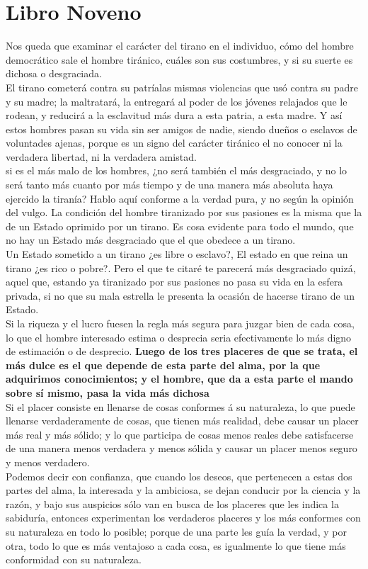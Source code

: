 \documentclass[10pt]{book}
\begin{document}
\chapter*{Libro Noveno}
Nos queda que examinar el carácter del tirano en el individuo, cómo del hombre democrático sale el hombre tiránico, cuáles son sus costumbres, y si su suerte es dichosa o desgraciada.\\ 
El tirano cometerá contra su patríalas mismas violencias que usó contra su padre y su madre; la maltratará, la entregará al poder de los jóvenes relajados que le rodean, y reducirá a la esclavitud más dura a esta patria, a esta madre. Y así estos hombres pasan su vida sin ser amigos de nadie, siendo dueños o esclavos de voluntades ajenas, porque es un signo del carácter tiránico el no conocer ni la verdadera libertad, ni la verdadera amistad.\\ 
 si es el más malo de los hombres, ¿no será también el más desgraciado, y no lo será tanto más cuanto por más tiempo y de una manera más absoluta haya ejercido la tiranía? Hablo aquí conforme a la verdad pura, y no según la opinión del vulgo. La condición del hombre tiranizado por sus pasiones es la misma que la de un Estado oprimido por un tirano. Es cosa evidente para todo el mundo, que no hay un Estado más desgraciado que el que obedece a un tirano. \\
Un Estado sometido a un tirano ¿es libre o esclavo?, El estado en que reina un tirano ¿es rico o pobre?. Pero el que te citaré te parecerá más desgraciado quizá, aquel que, estando ya tiranizado por sus pasiones no pasa su vida en la esfera privada, si no que su mala estrella le presenta la ocasión de hacerse tirano de un Estado.\\
Si la riqueza y el lucro fuesen la regla más segura para juzgar bien de cada cosa, lo que el hombre interesado estima o desprecia seria efectivamente lo más digno de estimación o de desprecio. 
\textbf{Luego de los tres placeres de que se trata, el más dulce es el que depende de esta parte del alma, por la que adquirimos conocimientos; y el hombre, que da a esta parte el mando sobre sí mismo, pasa la vida más dichosa}\\
Si el placer consiste en llenarse de cosas conformes á su naturaleza, lo que puede llenarse verdaderamente de cosas, que tienen más realidad, debe causar un placer más real y más sólido; y lo que participa de cosas menos reales debe satisfacerse de una manera menos verdadera y menos sólida y causar un placer menos seguro y menos verdadero. \\
Podemos decir con confianza, que cuando los deseos, que pertenecen a estas dos partes del alma, la interesada y la ambiciosa, se dejan conducir por la ciencia y la razón, y bajo sus auspicios sólo van en busca de los placeres que les indica la sabiduría, entonces experimentan los verdaderos placeres y los más conformes con su naturaleza en todo lo posible; porque de una parte les guía la verdad, y por otra, todo lo que es más ventajoso a cada cosa, es igualmente lo que tiene más conformidad con su naturaleza. \\
\end{document}
